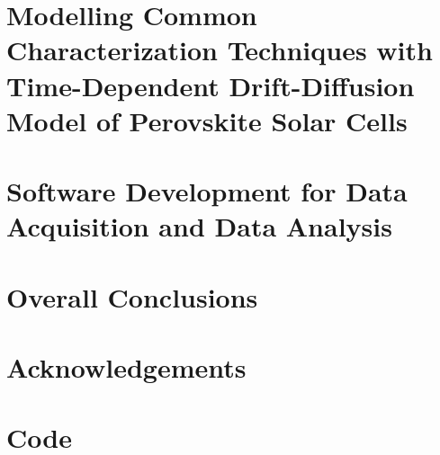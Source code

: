 \documentclass[b5paper, 12pt, openright]{book} %
\begin{document}
\chapter{Modelling Common Characterization Techniques with Time-Dependent Drift-Diffusion Model of Perovskite Solar Cells}\label{ch:modelling}
	\graphicspath{ {./contents_img/modelling/} }
	

\chapter{Software Development for Data Acquisition and Data Analysis}\label{ch:software}
	\graphicspath{ {./contents_img/software/} }
	

\chapter*[Overall Conclusions]{Overall Conclusions}\label{ch:conclusions}
	

\chapter*[Acknowledgements]{Acknowledgements}
	

	\appendix

\chapter{Code}
	\label{ch:code}
	\graphicspath{ {./contents_img/code/} }
	


	\printindex
\end{document}
